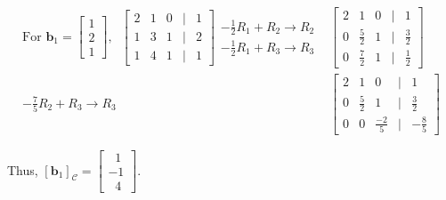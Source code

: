 \documentclass[a4paper,11pt,reqno]{amsart}
\numberwithin{equation}{section}
\begin{document}
\begin{enumerate}
\begin{center}
{{\begin{eqnarray*}
\text{For }  \mathbf{b}_1 = \begin{bmatrix} 1 \\ 2 \\ 1 \end{bmatrix}, \;\;
    \begin{bmatrix} 
    2 & 1 & 0 & | & 1 \\ 
    1 & 3 & 1 & | & 2 \\ 
    1 & 4 & 1 & | & 1 
    \end{bmatrix}
    \begin{array}{c}
      -\frac{1}{2} R_1 + R_2 \to R_2\\  
      - \frac{1}{2} R_1 + R_3 \to R_3 
    \end{array}& 
    \begin{bmatrix} 
    2 & 1 & 0 & | & 1 \\ 
    0 & \frac{5}{2} & 1 & | & \frac{3}{2} \\ 
    0 & \frac{7}{2} & 1 & | & \frac{1}{2} 
    \end{bmatrix}\\
    - \frac{7}{5} R_2 + R_3 \to R_3&
    \begin{bmatrix} 
    2 & 1 & 0 & | & 1 \\ 
    0 & \frac{5}{2} & 1 & | & \frac{3}{2} \\ 
    0 & 0 & \frac{-2}{5} & | & -\frac{8}{5} 
    \end{bmatrix}
    \end{eqnarray*}
    
    Thus, \( [\mathbf{b}_1]_{\mathcal{C}} = \begin{bmatrix} \;\;1 \\ -1 \\ \;\;4 \end{bmatrix} \).
    
}}
\end{center}
\end{enumerate}
\end{document}
